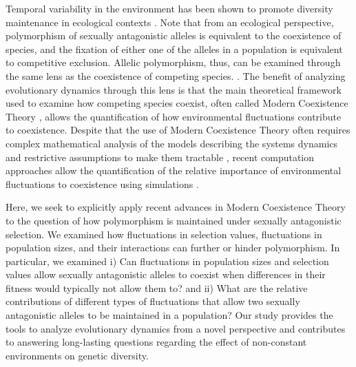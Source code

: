 \documentclass[12pt]{article}
\begin{document}
Temporal variability in the environment has been shown to promote diversity maintenance in ecological contexts \citep{levins1979coexistence,armstrong1980competitive,chesson2000general,barabas_chessons_2018}. Note that from an ecological perspective, polymorphism of sexually antagonistic alleles is equivalent to the coexistence of species, and the fixation of either one of the alleles in a population is equivalent to competitive exclusion. Allelic polymorphism, thus, can be examined through the same lens as the coexistence of competing species. \citep{ellner1994role,ellner1996patterns,dean2005protecting,schreiber2010interactive}. The benefit of analyzing evolutionary dynamics through this lens is that the main theoretical framework used to examine how competing species coexist, often called Modern Coexistence Theory \citep{Chesson2000,chesson1994multispecies, barabas_chessons_2018}, allows the quantification of how environmental fluctuations contribute to coexistence. Despite that the use of Modern Coexistence Theory often requires complex mathematical analysis of the models describing the systems dynamics and restrictive assumptions to make them tractable \citep{barabas_chessons_2018}, recent computation approaches allow the quantification of the relative importance of environmental fluctuations to coexistence using simulations \citep{ellner2016quantify,ellner_expanded_2019,shoemaker2020}.

Here, we seek to explicitly apply recent  advances in Modern Coexistence Theory to the question of how
polymorphism is maintained under sexually antagonistic selection.  We examined how fluctuations in selection values, fluctuations in population sizes, and their interactions can further or hinder polymorphism. In particular, we examined i) Can fluctuations in population sizes and selection values allow sexually antagonistic alleles to coexist when differences in their fitness would typically not allow them to? and ii) What are the relative contributions of different types of fluctuations that allow two sexually antagonistic alleles to be maintained in a population? Our study provides the tools to analyze evolutionary dynamics from a novel perspective and contributes to answering long-lasting questions regarding the effect of non-constant environments on genetic diversity.





\clearpage


\end{document}
